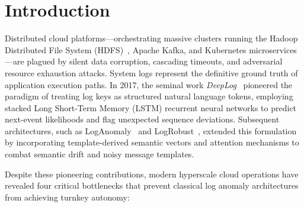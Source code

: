 \documentclass[letterpaper,twocolumn,10pt]{article}
\begin{document}
\section{Introduction}
\label{sec:intro}
Distributed cloud platforms---orchestrating massive clusters running the Hadoop Distributed File System (HDFS)~\cite{shvachko2010hadoop}, Apache Kafka, and Kubernetes microservices---are plagued by silent data corruption, cascading timeouts, and adversarial resource exhaustion attacks. System logs represent the definitive ground truth of application execution paths. In 2017, the seminal work \textit{DeepLog}~\cite{du2017deeplog} pioneered the paradigm of treating log keys as structured natural language tokens, employing stacked Long Short-Term Memory (LSTM) recurrent neural networks to predict next-event likelihoods and flag unexpected sequence deviations. Subsequent architectures, such as LogAnomaly~\cite{meng2019loganomaly} and LogRobust~\cite{zhang2019logrobust}, extended this formulation by incorporating template-derived semantic vectors and attention mechanisms to combat semantic drift and noisy message templates.

Despite these pioneering contributions, modern hyperscale cloud operations have revealed four critical bottlenecks that prevent classical log anomaly architectures from achieving turnkey autonomy:
\end{document}
